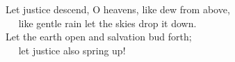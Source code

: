 
\lettrine{L}{}et justice descend, O heavens, like dew from above,\\
   like gentle rain let the skies drop it down.\\
Let the earth open and salvation bud forth;\\
   let justice also spring up!